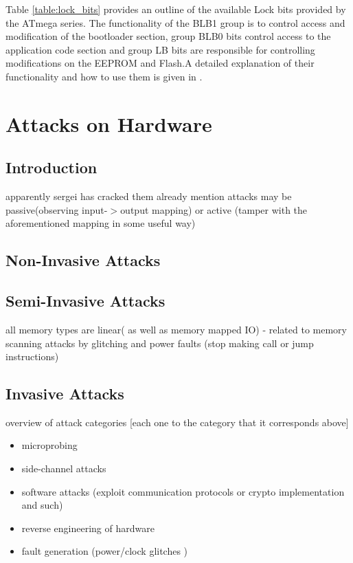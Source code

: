 \documentclass[10pt,a4paper,twocolumn]{article}
\begin{document}
Table \ref{table:lock_bits}	 provides an outline of the available Lock bits provided by the ATmega series. The functionality of the BLB1 group is to control access and modification of the bootloader section, group BLB0 bits control access to the application code section and group LB bits are responsible for controlling modifications on the EEPROM and Flash.A detailed explanation of their functionality and how to use them is given in \citep{atmega_manual}.
	
\section{Attacks on Hardware}
\label{sec:curr_attacks}
	\subsection{Introduction}
		apparently sergei has cracked them already \cite{website:scorobogatov_breaking_copy_protection}
	mention attacks may be passive(observing input-$>$output mapping) or active (tamper with the aforementioned mapping in some useful way)
	\subsection{Non-Invasive Attacks}
	\subsection{Semi-Invasive Attacks}
		all memory types are linear( as well as memory mapped IO) - related to memory scanning attacks by glitching and power faults (stop making call or jump instructions)
	\subsection{Invasive Attacks}

	overview of attack categories [each one to the category that it corresponds above]
	\begin{itemize}
		\item microprobing \\
		\item side-channel attacks \\
		\item software attacks (exploit communication protocols or crypto implementation and such) \\
		\item reverse engineering of hardware\\
		\item fault generation (power/clock glitches ) \\
	\end{itemize}
	
\end{document}
